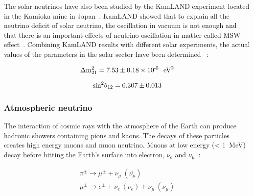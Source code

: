 \documentclass[main.tex]{subfiles}
\begin{document}
\bigskip


\NI The solar neutrinos have also been studied by the KamLAND experiment located in the Kamioka mine in Japan~\cite{Kamiokande2}. KamLAND showed that to explain all the neutrino deficit of solar neutrino, the oscillation in vacuum is not enough and that there is an important effects of neutrino oscillation in matter called MSW effect~\cite{MSW}. Combining KamLAND results with different solar experiments, the actual values of the parameters in the solar sector have been determined~\cite{PDG2016} : 

   

\begin{gather}
\Delta\text{m}_{\text{21}}^{\text{2}} = \text{7.53} \pm \text{0.18} \times \text{10}^{\text{\text{-5}}}~~\text{eV}^\text{2} \nonumber\\[1.5ex]
\text{sin}^\text{2} \theta_{\text{12}} = \text{0.307} \pm \text{0.013} 
\end{gather}




\FloatBarrier


\subsubsection{Atmospheric neutrino}

\NI The interaction of cosmic rays with the atmosphere of the Earth can produce hadronic showers containing pions and kaons. The decays of these particles creates high energy muons and muon neutrino. Muons at low energy (< 1~MeV) decay before hitting the Earth's surface into electron, $\nu_e$ and $\nu_\mu$~: 


\begin{gather}
\pi^{\pm} \rightarrow \mu^{\pm} + \nu_\mu~(\bar{\nu_\mu})
\nonumber\\[1.5ex]
\mu^\pm \rightarrow e^\pm + \nu_e~(\bar{\nu_e}) + \nu_\mu~(\bar{\nu_\mu})  
\end{gather}
\end{document}
